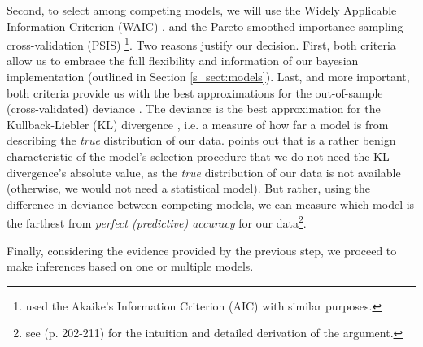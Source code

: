Second, to select among competing models, we will use the Widely Applicable Information Criterion (WAIC) \citep{Watanabe_2013}, and the Pareto-smoothed importance sampling cross-validation (PSIS) \citep{Vehtari_et_al_2021}\footnote{\citet{vanDaal_2020} used the Akaike’s Information Criterion (AIC) \citep{Akaike_1974} with similar purposes.}. Two reasons justify our decision. First, both criteria allow us to embrace the full flexibility and information of our bayesian implementation (outlined in Section \ref{s_sect:models}). Last, and more important, both criteria provide us with the best approximations for the out-of-sample (cross-validated) deviance \citep{McElreath_2020}. The deviance is the best approximation for the Kullback-Liebler (KL) divergence \citep{Kullback_et_al_1951}, i.e. a measure of how far a model is from describing the \textit{true} distribution of our data. \citet{McElreath_2020} points out that is a rather benign characteristic of the model's selection procedure that we do not need the KL divergence's absolute value, as the \textit{true} distribution of our data is not available (otherwise, we would not need a statistical model). But rather, using the difference in deviance between competing models, we can measure which model is the farthest from \textit{perfect (predictive) accuracy} for our data\footnote{see \citet{McElreath_2020} (p. 202-211) for the intuition and detailed derivation of the argument.}.

Finally, considering the evidence provided by the previous step, we proceed to make inferences based on one or multiple models.
%
%